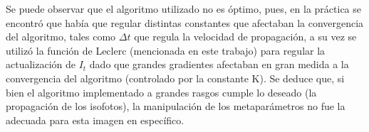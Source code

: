 \documentclass[assd_tpf_lineasinvest.tex]{subfiles}
\begin{document}
\begin{figure}[H]
\label{fig:difusionnuestro}
\end{figure}
Se puede observar que el algoritmo utilizado no es óptimo, pues, en la práctica se encontró que había que regular distintas constantes que afectaban la convergencia del algoritmo, tales como $\Delta t$ que regula la velocidad de propagación, a su vez se utilizó  la función de Leclerc (mencionada en este trabajo) para regular la actualización de $I_t$ dado que grandes gradientes afectaban en gran medida a la convergencia del algoritmo (controlado por la constante K).
Se deduce que, si bien el algoritmo implementado a grandes rasgos cumple lo deseado (la propagación de los isofotos), la manipulación de los metaparámetros no fue la adecuada para esta imagen en específico.
\end{document}
